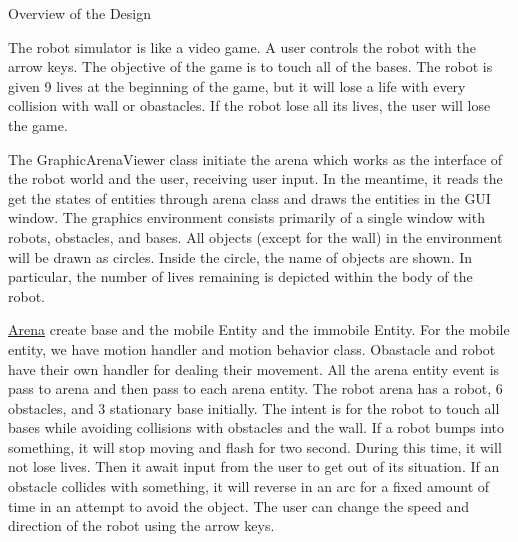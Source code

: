 Overview of the Design

The robot simulator is like a video game. A user controls the robot with the arrow keys. The objective of the game is to touch all of the bases. The robot is given 9 lives at the beginning of the game, but it will lose a life with every collision with wall or obastacles. If the robot lose all its lives, the user will lose the game.

The Graphic\+Arena\+Viewer class initiate the arena which works as the interface of the robot world and the user, receiving user input. In the meantime, it reads the get the states of entities through arena class and draws the entities in the G\+UI window. The graphics environment consists primarily of a single window with robots, obstacles, and bases. All objects (except for the wall) in the environment will be drawn as circles. Inside the circle, the name of objects are shown. In particular, the number of lives remaining is depicted within the body of the robot.

\hyperlink{classArena}{Arena} create base and the mobile Entity and the immobile Entity. For the mobile entity, we have motion handler and motion behavior class. Obastacle and robot have their own handler for dealing their movement. All the arena entity event is pass to arena and then pass to each arena entity. The robot arena has a robot, 6 obstacles, and 3 stationary base initially. The intent is for the robot to touch all bases while avoiding collisions with obstacles and the wall. If a robot bumps into something, it will stop moving and flash for two second. During this time, it will not lose lives. Then it await input from the user to get out of its situation. If an obstacle collides with something, it will reverse in an arc for a fixed amount of time in an attempt to avoid the object. The user can change the speed and direction of the robot using the arrow keys. 